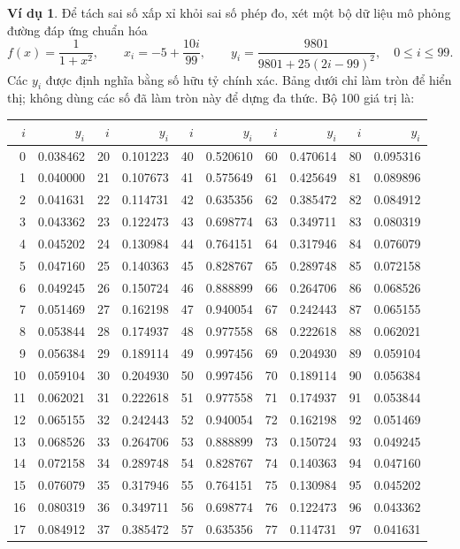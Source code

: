 \documentclass[12pt,a4paper,oneside]{book}
\numberwithin{algorithm}{chapter}
\theoremstyle{definition}
\newtheorem{vidu}{Ví dụ}[chapter]
\begin{document}

\begin{vidu}\label{vidu:newton-100}
Để tách sai số xấp xỉ khỏi sai số phép đo, xét một bộ dữ liệu mô phỏng đường đáp ứng chuẩn hóa
\[
 f(x)=\frac1{1+x^2},\qquad x_i=-5+\frac{10i}{99},\qquad
 y_i=\frac{9801}{9801+25(2i-99)^2},\quad0\leq i\leq99.
\]
Các $y_i$ được định nghĩa bằng số hữu tỷ chính xác. Bảng dưới chỉ làm tròn để hiển thị; không dùng các số đã làm tròn này để dựng đa thức.
Bộ 100 giá trị là:
\begin{center}
\small\setlength{\tabcolsep}{4pt}
\begin{tabular}{rr|rr|rr|rr|rr}\toprule
$i$&$y_i$&$i$&$y_i$&$i$&$y_i$&$i$&$y_i$&$i$&$y_i$\\\midrule
0&0.038462&20&0.101223&40&0.520610&60&0.470614&80&0.095316\\
1&0.040000&21&0.107673&41&0.575649&61&0.425649&81&0.089896\\
2&0.041631&22&0.114731&42&0.635356&62&0.385472&82&0.084912\\
3&0.043362&23&0.122473&43&0.698774&63&0.349711&83&0.080319\\
4&0.045202&24&0.130984&44&0.764151&64&0.317946&84&0.076079\\
5&0.047160&25&0.140363&45&0.828767&65&0.289748&85&0.072158\\
6&0.049245&26&0.150724&46&0.888899&66&0.264706&86&0.068526\\
7&0.051469&27&0.162198&47&0.940054&67&0.242443&87&0.065155\\
8&0.053844&28&0.174937&48&0.977558&68&0.222618&88&0.062021\\
9&0.056384&29&0.189114&49&0.997456&69&0.204930&89&0.059104\\
10&0.059104&30&0.204930&50&0.997456&70&0.189114&90&0.056384\\
11&0.062021&31&0.222618&51&0.977558&71&0.174937&91&0.053844\\
12&0.065155&32&0.242443&52&0.940054&72&0.162198&92&0.051469\\
13&0.068526&33&0.264706&53&0.888899&73&0.150724&93&0.049245\\
14&0.072158&34&0.289748&54&0.828767&74&0.140363&94&0.047160\\
15&0.076079&35&0.317946&55&0.764151&75&0.130984&95&0.045202\\
16&0.080319&36&0.349711&56&0.698774&76&0.122473&96&0.043362\\
17&0.084912&37&0.385472&57&0.635356&77&0.114731&97&0.041631\\

\end{tabular}
\end{center}
\end{vidu}
\end{document}
